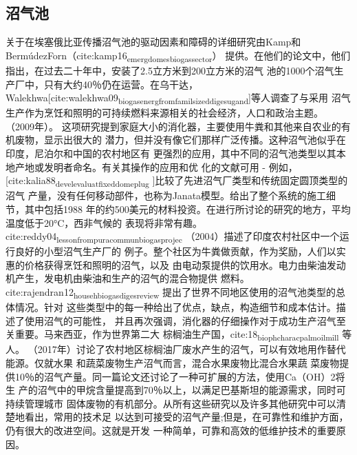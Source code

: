 \documentclass[11pt]{article}
\begin{document}
\subsection{沼气池}
\label{sec:org97fc5aa}
关于在埃塞俄比亚传播沼气池的驱动因素和障碍的详细研究由Kamp和BermúdezForn（cite:kamp16\textsubscript{emerg}\textsubscript{domes}\textsubscript{biogas}\textsubscript{sector}）
提供。在他们的论文中，他们指出，在过去二十年中，安装了2.5立方米到200立方米的沼气
池的1000个沼气生产厂中，只有大约40％仍在运营。在乌干达，Walekhwa[cite:walekhwa09\textsubscript{biogas}\textsubscript{energ}\textsubscript{from}\textsubscript{famil}\textsubscript{sized}\textsubscript{diges}\textsubscript{ugand}]等人调查了与采用
沼气生产作为烹饪和照明的可持续燃料来源相关的社会经济，人口和政治主题。 （2009年）。
这项研究提到家庭大小的消化器，主要使用牛粪和其他来自农业的有机废物，显示出很大的
潜力，但并没有像它们那样广泛传播。这种沼气池似乎在印度，尼泊尔和中国的农村地区有
更强烈的应用，其中不同的沼气池类型以其本地产地或发明者命名。有关其操作的应用和优
化的文献可用 - 例如， [cite:kalia88\textsubscript{devel}\textsubscript{evaluat}\textsubscript{fixed}\textsubscript{dome}\textsubscript{plug}
]比较了先进沼气厂类型和传统固定圆顶类型的沼气
产量，没有任何移动部件，也称为Janata模型。给出了整个系统的施工细节，其中包括1988
年的约500美元的材料投资。在进行所讨论的研究的地方，平均温度低于20°C，西非气候的
表现将非常有趣。 cite:reddy04\textsubscript{lesson}\textsubscript{from}\textsubscript{pura}\textsubscript{commun}\textsubscript{biogas}\textsubscript{projec} （2004）描述了印度农村社区中一个运行良好的小型沼气生产厂的
例子。整个社区为牛粪做贡献，作为奖励，人们以实惠的价格获得烹饪和照明的沼气，以及
由电动泵提供的饮用水。电力由柴油发动机产生，发电机由柴油和生产的沼气的混合物提供
燃料。 cite:rajendran12\textsubscript{househ}\textsubscript{biogas}\textsubscript{diges}\textsubscript{review} 提出了世界不同地区使用的沼气池类型的总体情况。针对
这些类型中的每一种给出了优点，缺点，构造细节和成本估计。描述了使用沼气的可能性，
并且再次强调，消化器的仔细操作对于成功生产沼气至关重要。马来西亚，作为世界第二大
棕榈油生产国，cite:18\textsubscript{bioph}\textsubscript{charac}\textsubscript{palm}\textsubscript{oil}\textsubscript{mill} 等人。
（2017年）讨论了农村地区棕榈油厂废水产生的沼气，可以有效地用作替代能源。仅就水果
和蔬菜废物生产沼气而言，混合水果废物比混合水果蔬
菜废物提供10％的沼气产量。同一篇论文还讨论了一种可扩展的方法，使用Ca（OH）2将生
产的沼气中的甲烷含量提高到70％以上，以满足巴基斯坦的能源需求，同时可持续管理城市
固体废物的有机部分。从所有这些研究以及许多其他研究中可以清楚地看出，常用的技术足
以达到可接受的沼气产量;但是，在可靠性和维护方面，仍有很大的改进空间。这就是开发
一种简单，可靠和高效的低维护技术的重要原因。
\end{document}
